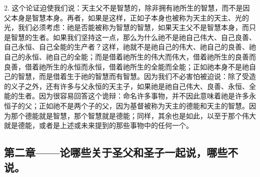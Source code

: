 2. 这个论证迫使我们说：天主父不是智慧的，除非拥有祂所生的智慧，而不是因父本身是智慧本身。再者，如果是这样，正如子本身也被称为天主的天主、光的光，我们必须考虑：祂是否能被称为智慧的智慧，如果天主父不是智慧本身，而只是智慧的生者。如果我们坚持这一点，那么为什么祂不是祂自己伟大、自己良善、自己永恒、自己全能的生产者？这样，祂就不是祂自己的伟大、祂自己的良善、祂自己的永恒、祂自己的全能；而是借着祂所生的伟大而伟大，借着祂所生的良善而良善，借着祂所生的永恒而永恒，借着祂所生的全能而全能；正如祂本身不是祂自己的智慧，而是借着生于祂的智慧而有智慧。因为我们不必害怕被迫说：除了受造的义子之外，还有许多与父永恒的天主子，如果祂是祂自己伟大、良善、永恒、全能的生者。因为很容易回答这个诡辩：命名许多事物，并不因此意味着祂是许多永恒子的父；正如祂不是两个子的父，因为基督被称为天主的德能和天主的智慧。因为那个德能就是智慧，那个智慧就是德能；同样，其余也是如此，以至于那个伟大就是德能，或者是上述或未来提到的那些事物中的任何一个。\par


\subsection{第二章——论哪些关于圣父和圣子一起说，哪些不说。}


